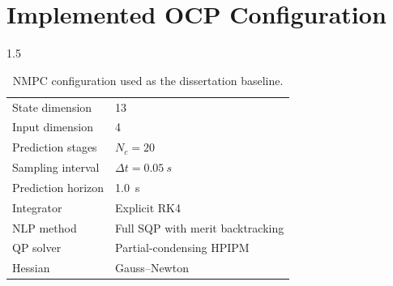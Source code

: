 \begin{appendices}
\label{cha:appendices}

\chapter{Implemented OCP Configuration}

\begin{spacing}{1.5}
\begin{table}[ht]
\centering
\caption{NMPC configuration used as the dissertation baseline.}
\begin{tabular}{@{}ll@{}}
\toprule
State dimension & 13 \\
Input dimension & 4 \\
Prediction stages & $N_c=20$ \\
Sampling interval & $\Delta t=\SI{0.05}{s}$ \\
Prediction horizon & \SI{1.0}{s} \\
Integrator & Explicit RK4 \\
NLP method & Full SQP with merit backtracking \\
QP solver & Partial-condensing HPIPM \\
Hessian & Gauss--Newton \\
\bottomrule
\end{tabular}
\end{table}


\end{spacing}
\end{appendices}

